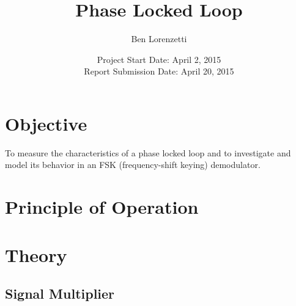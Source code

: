 \documentclass[titlepage, letterpaper, 10.5pt]{article}
\begin{document}
\title{Phase Locked Loop}
\author{Ben Lorenzetti}
\date{Project Start Date: April 2, 2015\\
Report Submission Date: April 20, 2015}
\maketitle

\clearpage
\mbox{}
\thispagestyle{empty}
\clearpage
\setcounter{page}{1}

\tableofcontents

\section{Objective}

To measure the characteristics of a phase locked loop and to investigate and model its behavior in an FSK (frequency-shift keying) demodulator.

\clearpage
\section{Principle of Operation}

\clearpage
\section{Theory}

\subsection{Signal Multiplier}
\end{document}
